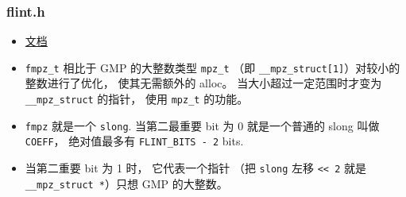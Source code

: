
\begin{issues}
\issueDraft
\end{issues}


\subsubsection{flint.h}
\begin{itemize}
\item \href{http://flintlib.org/sphinx/fmpz.html}{文档}
\item \verb`fmpz_t` 相比于 GMP 的大整数类型 \verb`mpz_t` （即 \verb`__mpz_struct[1]`）对较小的整数进行了优化， 使其无需额外的 alloc。 当大小超过一定范围时才变为 \verb`__mpz_struct` 的指针， 使用 \verb`mpz_t` 的功能。
\item \verb`fmpz` 就是一个 \verb`slong`. 当第二最重要 bit 为 0 就是一个普通的 slong 叫做 \verb`COEFF`， 绝对值最多有 \verb`FLINT_BITS - 2` bits.
\item 当第二重要 bit 为 1 时， 它代表一个指针 （把 \verb`slong` 左移 \verb`<< 2` 就是 \verb`__mpz_struct *`）只想 GMP 的大整数。
\end{itemize}
